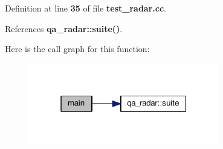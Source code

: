 Definition at line {\bf 35} of file {\bf test\+\_\+radar.\+cc}.



References {\bf qa\+\_\+radar\+::suite()}.



Here is the call graph for this function\+:
\nopagebreak
\begin{figure}[H]
\begin{center}
\leavevmode
\includegraphics[width=235pt]{d6/dd2/test__radar_8cc_a3c04138a5bfe5d72780bb7e82a18e627_cgraph}
\end{center}
\end{figure}


